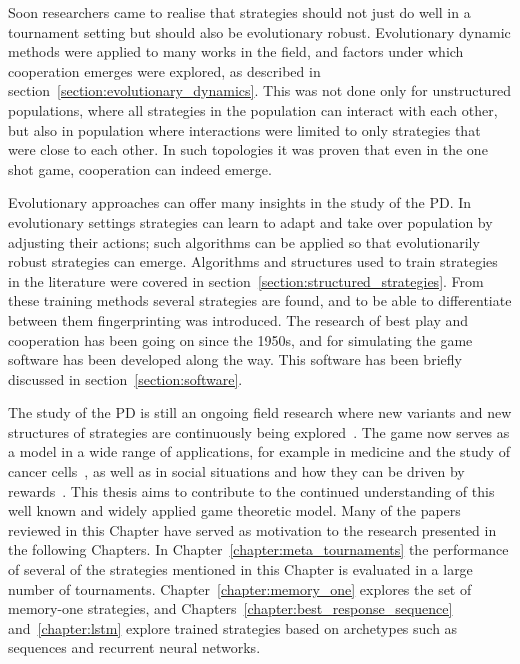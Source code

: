 Soon researchers came to realise that strategies should not just do well in a tournament setting
but should also be evolutionary robust. Evolutionary dynamic methods were
applied to many works in the field, and factors under which cooperation
emerges were explored, as described in section~\ref{section:evolutionary_dynamics}.
This was not done only for unstructured populations, where all strategies
in the population can interact with each other, but also in population where
interactions were limited to only strategies that were close to each other.
In such topologies it was proven that even in the one shot game, cooperation can
indeed emerge.

Evolutionary approaches can offer many insights in the study of the PD. In
evolutionary settings strategies can learn to adapt and take over population by
adjusting their actions; such algorithms can be applied so that evolutionarily
robust strategies can emerge. Algorithms and structures used to train strategies
in the literature were covered in section~\ref{section:structured_strategies}.
From these training methods several strategies are found,
and to be able to differentiate between them fingerprinting was
introduced. The research of best play and cooperation has been going on since
the 1950s, and for simulating the game software has been developed along the
way. This software has been briefly discussed
in section~\ref{section:software}.

The study of the PD is still an ongoing field research where new variants and
new structures of strategies are
continuously being explored~\cite{Ohtsuki2018}. The game now serves as a model
in a wide range of applications, for example in medicine and the study of cancer
cells~\cite{archetti2018, Kaznatchee2017}, as well as in social situations and
how they can be driven by rewards~\cite{Dridi2018}.
This thesis aims to contribute to the continued understanding of this well known
and widely applied game theoretic model.
Many of the papers reviewed in this Chapter have served as motivation to the
research presented in the following Chapters. In
Chapter~\ref{chapter:meta_tournaments} the performance of several of the
strategies mentioned in this Chapter is evaluated in a large number of
tournaments. Chapter~\ref{chapter:memory_one} explores the set of memory-one
strategies, and Chapters~\ref{chapter:best_response_sequence} and~\ref{chapter:lstm}
explore trained strategies based on archetypes such as sequences and recurrent
neural networks.
